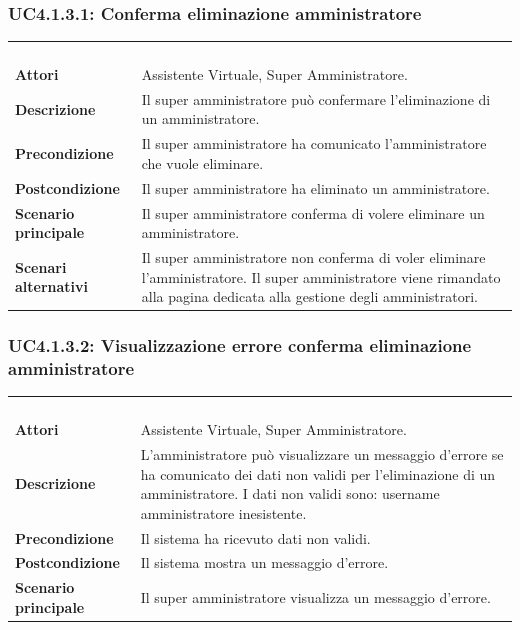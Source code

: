 \subsubsection{UC4.1.3.1: Conferma eliminazione amministratore}
\label{UC4.1.3.1}
\begin{longtable}{l|p{10cm}}
\rowcolor[gray]{0.8} \multicolumn{2}{c}{} \\
\rowcolor[gray]{0.8} \multicolumn{2}{c}{\textbf{UC4.1.3.1 - Conferma eliminazione amministratore}} \\
\rowcolor[gray]{0.8} \multicolumn{2}{c}{} \\
\hline
&\\
\textbf{Attori} & Assistente Virtuale, Super Amministratore.\\[7pt]
\textbf{Descrizione} & Il super amministratore può confermare l'eliminazione di un amministratore.\\[7pt]
\textbf{Precondizione} & Il super amministratore ha comunicato l'amministratore che vuole eliminare.\\[7pt]
\textbf{Postcondizione} & Il super amministratore ha eliminato un amministratore.\\[7pt]
\textbf{Scenario principale} &Il super amministratore conferma di volere eliminare un amministratore.\\[7pt]
\textbf{Scenari alternativi} & Il super amministratore non conferma di voler eliminare l'amministratore. Il super amministratore viene rimandato alla pagina dedicata alla gestione degli amministratori.\\[7pt]\hline
\end{longtable}

\subsubsection{UC4.1.3.2: Visualizzazione errore conferma eliminazione amministratore}
\label{UC4.1.3.2}
\begin{longtable}{l|p{10cm}}
\rowcolor[gray]{0.8} \multicolumn{2}{c}{} \\
\rowcolor[gray]{0.8} \multicolumn{2}{c}{\textbf{UC4.1.3.2 - Visualizzazione errore conferma eliminazione amministratore}} \\
\rowcolor[gray]{0.8} \multicolumn{2}{c}{} \\
\hline
&\\
\textbf{Attori} & Assistente Virtuale, Super Amministratore.\\[7pt]
\textbf{Descrizione} & L'amministratore può visualizzare un messaggio d'errore se ha comunicato dei dati non validi per l'eliminazione di un amministratore.
I dati non validi sono: username amministratore inesistente.\\[7pt]
\textbf{Precondizione} & Il sistema ha ricevuto dati non validi.\\[7pt]
\textbf{Postcondizione} & Il sistema mostra un messaggio d'errore.\\[7pt]
\textbf{Scenario principale} &Il super amministratore visualizza un messaggio d'errore.\\[7pt]\hline
\end{longtable}

